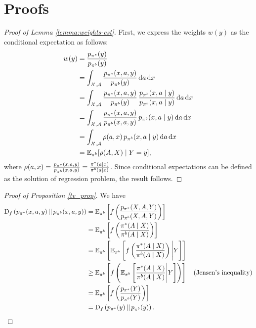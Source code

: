 
\newpage

\section{Proofs}
\begin{proof}[Proof of Lemma \ref{lemma:weights-est}]
First, we express the weights $w(y)$ as the conditional expectation as follows:
\begin{align*}
    w(y) &= \frac{p_{\pi^*}(y)}{p_{\pi^b}(y)} \\
    &= \int_{\mathcal{X}, \mathcal{A}} \frac{p_{\pi^*}(x,a,y)}{p_{\pi^b}(y)}\,\mathrm{d}a\, \mathrm{d}x\\
    &= \int_{\mathcal{X}, \mathcal{A}} \frac{p_{\pi^*}(x,a,y)}{p_{\pi^b}(y)}\,\frac{p_{\pi^b}(x, a\mid y)}{p_{\pi^b}(x, a\mid y)}\,\mathrm{d}a\, \mathrm{d}x\\
    &= \int_{\mathcal{X}, \mathcal{A}} \frac{p_{\pi^*}(x,a,y)}{p_{\pi^b}(x, a, y)}\,p_{\pi^b}(x, a\mid y)\,\mathrm{d}a\, \mathrm{d}x\\
    &= \int_{\mathcal{X}, \mathcal{A}} \rho(a, x)\,p_{\pi^b}(x, a\mid y)\,\mathrm{d}a\, \mathrm{d}x\\
    &= \mathbb{E}_{\pi^b}[\rho(A, X)\mid Y=y],
\end{align*}
where $\rho(a, x) = \frac{p_{\pi^*}(x, a, y)}{p_{\pi^b}(x, a, y)} = \frac{\pi^*(a\mid x)}{\pi^b(a\mid x)}$.
Since conditional expectations can be defined as the solution of regression problem, the result follows. 
\end{proof}

\begin{proof}[Proof of Proposition \ref{tv_prop}] We have
\begin{align*}
    \textup{D}_f\left(p_{\pi^*}(x,a,y)\,||\, p_{\pi^b}(x,a,y)\right) &= \mathbb{E}_{\pi^b}\left[ f\left( \frac{p_{\pi^*}(X,A,Y)}{p_{\pi^b}(X,A,Y)}\right) \right]\\
    &= \mathbb{E}_{\pi^b}\left[ f\left( \frac{\pi^*(A\mid X)}{\pi^b(A\mid X)}\right) \right]\\
    &= \mathbb{E}_{\pi^b}\left[\mathbb{E}_{\pi^b}\left[ f\left( \frac{\pi^*(A\mid X)}{\pi^b(A\mid X)}\right) \Bigg| Y \right]\right]\\
    &\geq \mathbb{E}_{\pi^b}\left[ f\left( \mathbb{E}_{\pi^b}\left[\frac{\pi^*(A\mid X)}{\pi^b(A\mid X)}\Bigg| Y \right]\right) \right]\quad\text{(Jensen's inequality)}\\
    &= \mathbb{E}_{\pi^b}\left[ f\left( \frac{p_{\pi^*}(Y)}{p_{\pi^b}(Y)} \right) \right]\\
    &= \textup{D}_f\left(p_{\pi^*}(y)\,||\, p_{\pi^b}(y)\right).
\end{align*}
\end{proof}

